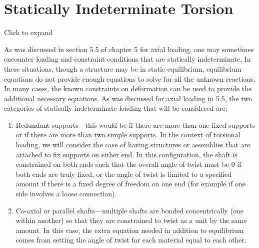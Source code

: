 \documentclass[
  letterpaper,
  DIV=11,
  numbers=noendperiod]{scrreprt}
\begin{document}
\section{Statically Indeterminate Torsion}\label{sec-6.3}

Click to expand

As was discussed in section 5.5 of chapter 5 for axial loading, one may
sometimes encounter loading and constraint conditions that are
statically indeterminate. In these situations, though a structure may be
in static equilibrium, equilibrium equations do not provide enough
equations to solve for all the unknown reactions. In many cases, the
known constraints on deformation can be used to provide the additional
necessary equations. As was discussed for axial loading in 5.5, the two
categories of statically indeterminate loading that will be considered
are:

\begin{enumerate}
\def\labelenumi{\arabic{enumi}.}
\item
  Redundant supports---this would be if there are more than one fixed
  supports or if there are more than two simple supports. In the context
  of torsional loading, we will consider the case of having structures
  or assemblies that are attached to fix supports on either end. In this
  configuration, the shaft is constrained on both ends such that the
  overall angle of twist must be 0 if both ends are truly fixed, or the
  angle of twist is limited to a specified amount if there is a fixed
  degree of freedom on one end (for example if one side involves a loose
  connection).
\item
  Co-axial or parallel shafts---multiple shafts are bonded
  concentrically (one within another) so that they are constrained to
  twist as a unit by the same amount. In this case, the extra equation
  needed in addition to equilibrium comes from setting the angle of
  twist for each material equal to each other.
\end{enumerate}
\end{document}
